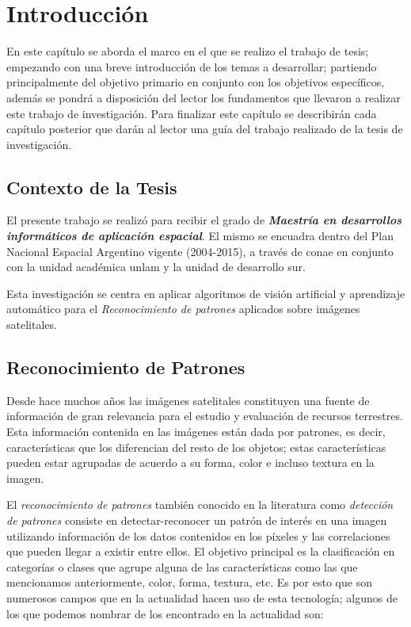 \chapter{Introducción}\label{chap:introduccion}

En este capítulo se aborda el marco en el que se realizo el trabajo de tesis; empezando con una breve introducción de los temas a desarrollar; partiendo principalmente del objetivo primario en conjunto con los objetivos específicos, además se pondrá a disposición del lector los fundamentos que llevaron a realizar este trabajo de investigación. Para finalizar este capítulo se describirán cada capítulo posterior que darán al lector una guía del trabajo realizado de la tesis de investigación.


\section{Contexto de la Tesis}\label{sec:contexto}
El presente trabajo se realizó para recibir el grado de\textbf{ \textit{Maestría en desarrollos informáticos de aplicación espacial}}. El mismo se encuadra dentro del Plan Nacional Espacial Argentino vigente (2004-2015), a través de \ac{conae} en conjunto con la unidad académica \ac{unlam} y la unidad de desarrollo \ac{sur}.

Esta investigación se centra en aplicar  algoritmos de visión artificial y aprendizaje automático para el \textit{Reconocimiento de patrones} aplicados sobre imágenes satelitales.

\section{Reconocimiento de Patrones}\label{sec:introreconocimiento}
Desde hace muchos años las imágenes satelitales constituyen una fuente de información de gran relevancia para el estudio y evaluación de recursos terrestres. Esta  información contenida en las imágenes están dada por patrones, es decir, características que los diferencian del resto de los objetos; estas características pueden estar agrupadas  de acuerdo a su forma, color e incluso textura en la imagen.

El \textit{reconocimiento de patrones} también conocido en la literatura como \textit{detección de patrones} consiste en detectar-reconocer un patrón de interés en una imagen utilizando información de los datos contenidos en los píxeles y las correlaciones que pueden llegar a existir entre ellos. El objetivo principal es la clasificación  en categorías o clases que agrupe alguna de las características como las que mencionamos anteriormente, color, forma, textura, etc. Es por esto que son numerosos campos que en la actualidad hacen uso de esta tecnología; algunos de los que podemos nombrar de los encontrado en la actualidad son:

